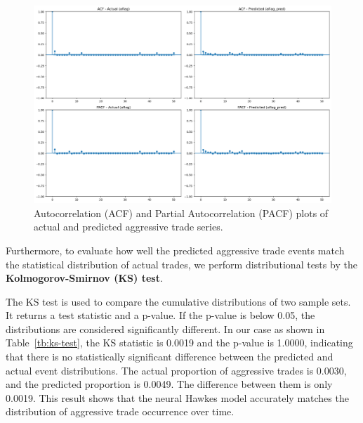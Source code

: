 
\begin{figure}[H]
    \centering
    \includegraphics[width=0.95\linewidth]{figures/ACF_181330.png}
    \caption{Autocorrelation (ACF) and Partial Autocorrelation (PACF) plots of actual and predicted aggressive trade series.}
    \label{fig:acf-pacf}
\end{figure}



Furthermore, to evaluate how well the predicted aggressive trade events match the statistical distribution of actual trades, we perform distributional tests by the \textbf{Kolmogorov-Smirnov (KS) test}. 

The KS test is used to compare the cumulative distributions of two sample sets. It returns a test statistic and a p-value. If the p-value is below 0.05, the distributions are considered significantly different. In our case as shown in Table~\ref{tb:ks-test}, the KS statistic is 0.0019 and the p-value is 1.0000, indicating that there is no statistically significant difference between the predicted and actual event distributions. The actual proportion of aggressive trades is 0.0030, and the predicted proportion is 0.0049. The difference between them is only 0.0019. This result shows that the neural Hawkes model accurately matches the distribution of aggressive trade occurrence over time.

